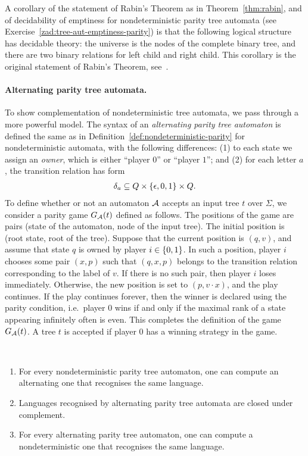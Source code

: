 A corollary of the  statement of Rabin's Theorem as in Theorem~\ref{thm:rabin}, and of decidability of emptiness for nondeterministic parity tree automata (see Exercise~\ref{zad:tree-aut-emptiness-parity})  is that the following logical structure has decidable \mso theory: the universe is the nodes of the complete binary tree, and there are two binary relations for left child and right child. This corollary is the 
original statement of Rabin's Theorem, see~\cite[Theorem 1.1.]{Rabin:1969kx}.

\paragraph*{Alternating parity tree automata.} To show complementation of nondeterministic tree automata, we  pass through a more powerful model. The syntax of an \emph{alternating parity tree automaton} is defined the same as in Definition~\ref{def:nondeterministic-parity} for nondeterministic automata, with the following differences: (1) to each state we assign an \emph{owner}, which is either ``player $0$'' or ``player $1$''; and (2) for each letter $a$, the transition relation has form
\begin{align*}
 \delta_a \subseteq Q \times  \{\epsilon,0,1\} \times Q .
\end{align*}
To define whether or not an automaton $\mathcal{A}$ accepts an input tree $t$ over $\Sigma$, we consider a parity game $G_{\mathcal{A}}(t)$ defined as follows. The positions of the game are pairs (state of the automaton, node of the input tree). The initial position is (root state, root of the tree). Suppose that the current position is $(q,v)$, and assume that state $q$ is owned by player $i \in \{0,1\}$. In such a position, player $i$ chooses some pair $(x,p)$ such that $(q,x,p)$  belongs to the transition relation corresponding to the label of $v$. If there is no such pair, then player $i$ loses immediately. Otherwise, the new position is set to $(p,v \cdot x)$, and the play continues. If the play continues forever, then the winner is declared using the parity condition, i.e.~player $0$ wins if and only if the maximal rank of a state appearing infinitely often is even. This completes the definition of the game $G_{\mathcal{A}}(t)$. A tree $t$ is accepted if player $0$ has a winning strategy in the game.





\begin{theorem}\label{thm:alternating}\ 
\begin{enumerate}
	\item 	For every nondeterministic parity tree automaton, one can compute  an alternating one that recognises the same language. 
	\item Languages recognised by alternating parity tree automata are closed under complement.
	\item For every  alternating  parity  tree automaton, one can compute a nondeterministic  one that  recognises the same language.
\end{enumerate}
\end{theorem}

